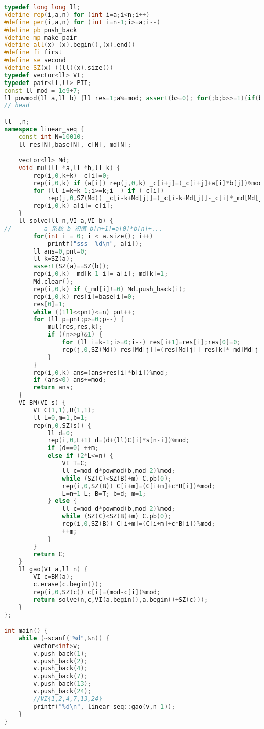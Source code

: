 \begin{lstlisting}[language=C++]
typedef long long ll;
#define rep(i,a,n) for (int i=a;i<n;i++)
#define per(i,a,n) for (int i=n-1;i>=a;i--)
#define pb push_back
#define mp make_pair
#define all(x) (x).begin(),(x).end()
#define fi first
#define se second
#define SZ(x) ((ll)(x).size())
typedef vector<ll> VI;
typedef pair<ll,ll> PII;
const ll mod = 1e9+7;
ll powmod(ll a,ll b) {ll res=1;a%=mod; assert(b>=0); for(;b;b>>=1){if(b&1)res=res*a%mod;a=a*a%mod;}return res;}
// head

ll _,n;
namespace linear_seq {
    const int N=10010;
    ll res[N],base[N],_c[N],_md[N];

    vector<ll> Md;
    void mul(ll *a,ll *b,ll k) {
        rep(i,0,k+k) _c[i]=0;
        rep(i,0,k) if (a[i]) rep(j,0,k) _c[i+j]=(_c[i+j]+a[i]*b[j])%mod;
        for (ll i=k+k-1;i>=k;i--) if (_c[i])
            rep(j,0,SZ(Md)) _c[i-k+Md[j]]=(_c[i-k+Md[j]]-_c[i]*_md[Md[j]])%mod;
        rep(i,0,k) a[i]=_c[i];
    }
    ll solve(ll n,VI a,VI b) {
//         a 系数 b 初值 b[n+1]=a[0]*b[n]+...
        for(int i = 0; i < a.size(); i++)
            printf("sss  %d\n", a[i]);
        ll ans=0,pnt=0;
        ll k=SZ(a);
        assert(SZ(a)==SZ(b));
        rep(i,0,k) _md[k-1-i]=-a[i];_md[k]=1;
        Md.clear();
        rep(i,0,k) if (_md[i]!=0) Md.push_back(i);
        rep(i,0,k) res[i]=base[i]=0;
        res[0]=1;
        while ((1ll<<pnt)<=n) pnt++;
        for (ll p=pnt;p>=0;p--) {
            mul(res,res,k);
            if ((n>>p)&1) {
                for (ll i=k-1;i>=0;i--) res[i+1]=res[i];res[0]=0;
                rep(j,0,SZ(Md)) res[Md[j]]=(res[Md[j]]-res[k]*_md[Md[j]])%mod;
            }
        }
        rep(i,0,k) ans=(ans+res[i]*b[i])%mod;
        if (ans<0) ans+=mod;
        return ans;
    }
    VI BM(VI s) {
        VI C(1,1),B(1,1);
        ll L=0,m=1,b=1;
        rep(n,0,SZ(s)) {
            ll d=0;
            rep(i,0,L+1) d=(d+(ll)C[i]*s[n-i])%mod;
            if (d==0) ++m;
            else if (2*L<=n) {
                VI T=C;
                ll c=mod-d*powmod(b,mod-2)%mod;
                while (SZ(C)<SZ(B)+m) C.pb(0);
                rep(i,0,SZ(B)) C[i+m]=(C[i+m]+c*B[i])%mod;
                L=n+1-L; B=T; b=d; m=1;
            } else {
                ll c=mod-d*powmod(b,mod-2)%mod;
                while (SZ(C)<SZ(B)+m) C.pb(0);
                rep(i,0,SZ(B)) C[i+m]=(C[i+m]+c*B[i])%mod;
                ++m;
            }
        }
        return C;
    }
    ll gao(VI a,ll n) {
        VI c=BM(a);
        c.erase(c.begin());
        rep(i,0,SZ(c)) c[i]=(mod-c[i])%mod;
        return solve(n,c,VI(a.begin(),a.begin()+SZ(c)));
    }
};

int main() {
    while (~scanf("%d",&n)) {
        vector<int>v;
        v.push_back(1);
        v.push_back(2);
        v.push_back(4);
        v.push_back(7);
        v.push_back(13);
        v.push_back(24);
        //VI{1,2,4,7,13,24}
        printf("%d\n", linear_seq::gao(v,n-1));
    }
}
\end{lstlisting}


